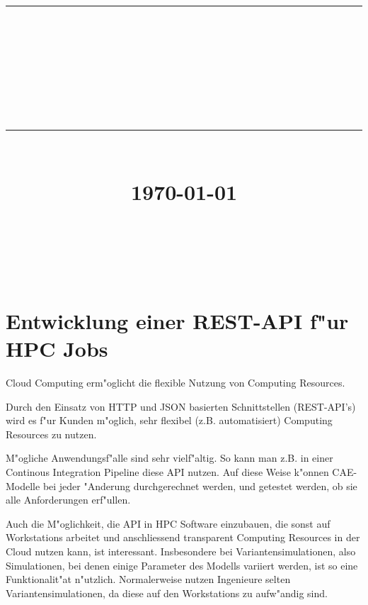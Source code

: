 \documentclass[12pt]{article}
\newcommand{\HRule}[1]{\rule{\linewidth}{#1}}
\begin{document}
\title{ \normalsize
		\HRule{0.5pt} \\
		\LARGE \textbf{\uppercase{\newCommandDiscipline}} \\
    \smallbreak
		\small\textbf{{\newCommandTerm}}\\
		\HRule{2pt} \\ [0.5cm]
		\normalsize \today \vspace*{10\baselineskip}}

\date{}

\author{
		\newCommandName \\
		\newCommandMatriculationNumber \\
		\newCommandUniversity \\
		\newCommandFaculty
}


\maketitle

\newpage



\sectionfont{\scshape}


\section{Entwicklung einer REST-API f"ur HPC Jobs}
Cloud Computing erm"oglicht die flexible Nutzung von Computing Resources.

Durch den Einsatz von HTTP und JSON basierten Schnittstellen (REST-API's) wird es f"ur Kunden m"oglich, sehr flexibel (z.B. automatisiert) Computing Resources zu nutzen.

M"ogliche Anwendungsf"alle sind sehr vielf"altig. So kann man z.B. in einer Continous Integration Pipeline diese API nutzen. Auf diese Weise k"onnen CAE-Modelle bei jeder "Anderung durchgerechnet werden, und getestet werden, ob sie alle Anforderungen erf"ullen.

Auch die M"oglichkeit, die API in HPC Software einzubauen, die sonst auf Workstations arbeitet und anschliessend transparent Computing Resources in der Cloud nutzen kann, ist interessant. Insbesondere bei Variantensimulationen, also Simulationen, bei denen einige Parameter des Modells variiert werden, ist so eine Funktionalit"at n"utzlich. Normalerweise nutzen Ingenieure selten Variantensimulationen, da diese auf den Workstations zu aufw"andig sind.
\end{document}
